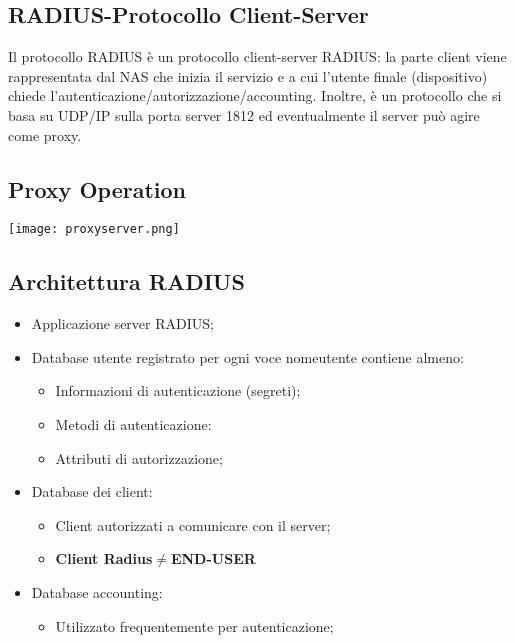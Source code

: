 \documentclass{article}
\theoremstyle{remark}
\begin{document}
\subsection{RADIUS-Protocollo Client-Server}
Il protocollo RADIUS è un protocollo client-server RADIUS: la parte client viene rappresentata dal NAS che inizia il servizio e a cui l'utente finale (dispositivo) chiede l'autenticazione/autorizzazione/accounting. Inoltre, è un protocollo che si basa su UDP/IP sulla porta server 1812 ed eventualmente il server può agire come proxy.
\subsection{Proxy Operation}
\begin{center}
    \texttt{[image: proxyserver.png]}
\end{center}
\subsection{Architettura RADIUS}
\begin{itemize}
    \item Applicazione server RADIUS;
    \item Database utente registrato per ogni voce nomeutente contiene almeno:\begin{itemize}
        \item Informazioni di autenticazione (segreti);
        \item Metodi di autenticazione:
        \item Attributi di autorizzazione;
    \end{itemize}
    \item Database dei client:\begin{itemize}
        \item Client autorizzati a comunicare con il server;
        \item \textbf{Client Radius}$\neq$\textbf{END-USER}
        
    \end{itemize}
    \item Database accounting:\begin{itemize}
        \item Utilizzato frequentemente per autenticazione;
    \end{itemize}
\end{itemize}
\end{document}
